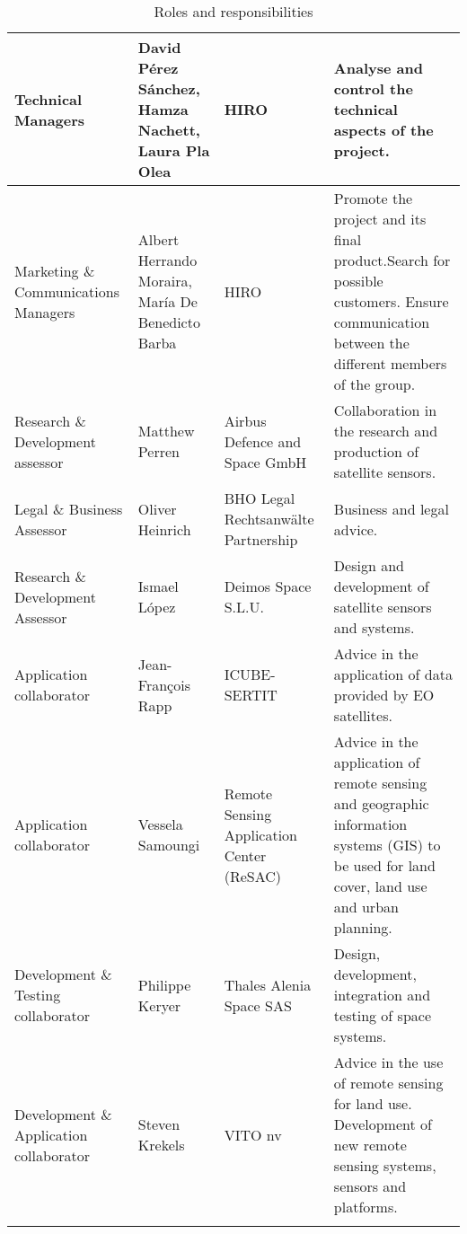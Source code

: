 \begin{small}
\begin{longtable}{>{\raggedright\arraybackslash}p{2.5cm} >{\raggedright\arraybackslash}p{2.8cm} >{\raggedright\arraybackslash}p{2.6cm}>{\raggedright\arraybackslash}p{5.2cm}}
		Technical Managers & David Pérez Sánchez, \newline  Hamza Nachett, \newline  Laura Pla Olea & HIRO & Analyse and control the technical aspects of the project. \\ \midrule

		Marketing \& Communications Managers & Albert Herrando Moraira, \newline  María De Benedicto Barba & HIRO & Promote the project and its final product.\newline Search for possible customers.\newline 
		Ensure communication between the different members of the group. \\ \midrule

		Research \& Development assessor & Matthew Perren & Airbus Defence and Space GmbH & Collaboration in the research and production of satellite sensors. \\ \midrule

		Legal \& Business Assessor & Oliver Heinrich & BHO Legal Rechtsanwälte Partnership & Business and legal advice. \\ \midrule

		Research \& Development Assessor & Ismael López & Deimos Space S.L.U. & Design and development of satellite sensors and systems. \\ \midrule

		Application collaborator & Jean-François Rapp & ICUBE-SERTIT & Advice in the application of data provided by EO satellites. \\ \midrule

		Application collaborator & Vessela Samoungi & Remote Sensing Application Center (ReSAC) & Advice in the application of remote sensing and geographic information systems (GIS) to be used for land cover, land use and urban planning. \\ \midrule

		Development \& Testing collaborator & Philippe Keryer & Thales Alenia Space SAS & Design, development, integration and testing of space systems. \\ \midrule

		Development \& Application collaborator & Steven Krekels & VITO nv & Advice in the use of remote sensing for land use. Development of new remote sensing systems, sensors and platforms. 
		\\ \bottomrule[2pt]

		\caption{Roles and responsibilities}
		\label{table_roles}	
	\end{longtable}
	\end{small}
